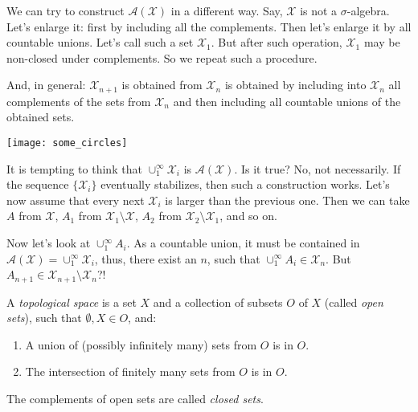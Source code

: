 \begin{remark}
    We can try to construct $\mathcal{A}(\mathcal{X})$ in a different way.
    Say, $\mathcal{X}$ is not a $\sigma$-algebra. Let's enlarge it:
    first by including all the complements. Then let's enlarge it
    by all countable unions. Let's call such a set $\mathcal{X}_1$.
    But after such operation, $\mathcal{X}_1$ may be non-closed under complements.
    So we repeat such a procedure.

    And, in general: $\mathcal{X}_{n + 1}$ is obtained from $\mathcal{X}_n$
    is obtained by including into $\mathcal{X}_n$ all complements of the 
    sets from $\mathcal{X}_n$ and then including all countable unions of the obtained sets.

    \begin{figure*}[h]
        \centering
        \texttt{[image: some\_circles]}
    \end{figure*}

    It is tempting to think that $\cup_{1}^\infty \mathcal{X}_i$ is $\mathcal{A}(\mathcal{X})$.
    Is it true? No, not necessarily.
    If the sequence $\{\mathcal{X}_i\}$ eventually stabilizes, then such a construction works.
    Let's now assume that every next $\mathcal{X}_i$ is larger than the previous one.
    Then we can take $A$ from $\mathcal{X}$, $A_1$ from $\mathcal{X}_1 \setminus \mathcal{X}$,
    $A_2$ from $\mathcal{X}_2 \setminus \mathcal{X}_1$, and so on.

    Now let's look at $\cup_{1}^\infty A_i$. As a countable union, it must be contained
    in $\mathcal{A}(\mathcal{X}) = \cup_{1}^\infty \mathcal{X}_i$, thus, there exist an $n$, such that
    $\cup_{1}^\infty A_i \in \mathcal{X}_n$. But $A_{n+1} \in \mathcal{X}_{n+1} \setminus \mathcal{X}_n$?!
\end{remark}

\begin{definition}
    A \textit{topological space} is a set $X$ and a collection
    of subsets $O$ of $X$ (called \textit{open sets}), such that $\emptyset, X \in O$, and:
    \begin{enumerate}
        \item {
            A union of (possibly infinitely many) sets from $O$
            is in $O$.
        }
        \item {
            The intersection of finitely many sets from $O$
            is in $O$.
        }
    \end{enumerate}
    The complements of open sets are called \textit{closed sets}.
\end{definition}


